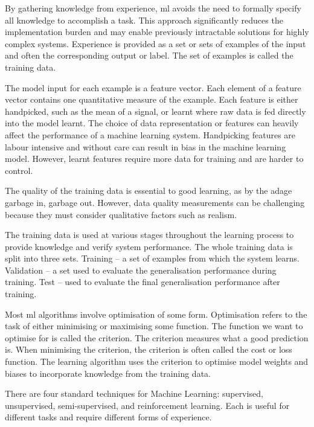 By gathering knowledge from experience, \acrshort{ml} avoids the need to formally specify all knowledge to accomplish a task\cite{Goodfellow2015}. This approach significantly reduces the implementation burden and may enable previously intractable solutions for highly complex systems. Experience is provided as a set or sets of examples of the input and often the corresponding output or label. The set of examples is called the training data.

The model input for each example is a feature vector. Each element of a feature vector contains one quantitative measure of the example. Each feature is either handpicked, such as the mean of a signal, or learnt where raw data is fed directly into the model learnt. The choice of data representation or features can heavily affect the performance of a machine learning system. Handpicking features are labour intensive and without care can result in bias in the machine learning model. However, learnt features require more data for training and are harder to control.\cite{Bengio2013}

The quality of the training data is essential to good learning, as by the adage garbage in, garbage out. However, data quality measurements can be challenging because they must consider qualitative factors such as realism.

The training data is used at various stages throughout the learning process to provide knowledge and verify system performance. The whole training data is split into three sets. Training – a set of examples from which the system learns. Validation – a set used to evaluate the generalisation performance during training. Test – used to evaluate the final generalisation performance after training. 

Most \acrshort{ml} algorithms involve optimisation of some form. Optimisation refers to the task of either minimising or maximising some function. The function we want to optimise for is called the criterion. The criterion measures what a good prediction is. When minimising the criterion, the criterion is often called the cost or loss function.\cite{Goodfellow2015} The learning algorithm uses the criterion to optimise model weights and biases to incorporate knowledge from the training data.

There are four standard techniques for Machine Learning: supervised, unsupervised, semi-supervised, and reinforcement learning. Each is useful for different tasks and require different forms of experience.

